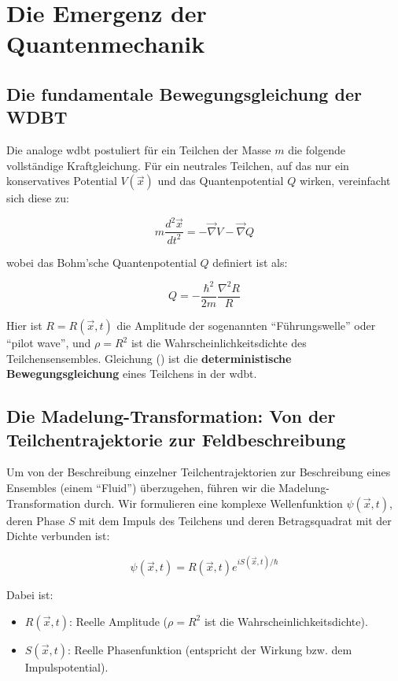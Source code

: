 \chapter{Die Emergenz der Quantenmechanik}
\section{Die fundamentale Bewegungsgleichung der WDBT}
Die analoge \gls{wdbt} postuliert für ein Teilchen der Masse $m$ die folgende vollständige Kraftgleichung. Für ein neutrales Teilchen, auf das nur ein konservatives Potential $V(\vec{x})$ und das
Quantenpotential $Q$ wirken, vereinfacht sich diese zu:

\begin{equation}
    \label{eq:deterministische_bewegungsgleichung}
    m \frac{d^2\vec{x}}{dt^2} = -\vec{\nabla} V - \vec{\nabla} Q
\end{equation}

wobei das Bohm'sche Quantenpotential $Q$ definiert ist als:

\begin{equation}
    \label{eq:quantenpotential}
    Q = -\frac{\hbar^2}{2m} \frac{\nabla^2 R}{R}
\end{equation}

Hier ist $R = R(\vec{x},t)$ die Amplitude der sogenannten \enquote{Führungswelle} oder \enquote{pilot wave}, und $\rho = R^2$ ist die Wahrscheinlichkeitsdichte des Teilchensensembles. Gleichung
() ist die \textbf{deterministische Bewegungsgleichung} eines Teilchens in der \gls{wdbt}.

\section{Die Madelung-Transformation: Von der Teilchentrajektorie zur Feldbeschreibung}
Um von der Beschreibung einzelner Teilchentrajektorien zur Beschreibung eines Ensembles (einem \enquote{Fluid}) überzugehen, führen wir die Madelung-Transformation durch. Wir formulieren eine komplexe
Wellenfunktion $\psi(\vec{x}, t)$, deren Phase $S$ mit dem Impuls des Teilchens und deren Betragsquadrat mit der Dichte verbunden ist:

\begin{equation}
    \psi(\vec{x}, t) = R(\vec{x}, t)  e^{i S(\vec{x}, t) / \hbar}
\end{equation}

Dabei ist:

\begin{itemize}
    \item $R(\vec{x},t)$: Reelle Amplitude ($\rho = R^2$ ist die Wahrscheinlichkeitsdichte).
    \item $S(\vec{x},t)$: Reelle Phasenfunktion (entspricht der Wirkung bzw. dem Impulspotential).
\end{itemize}

